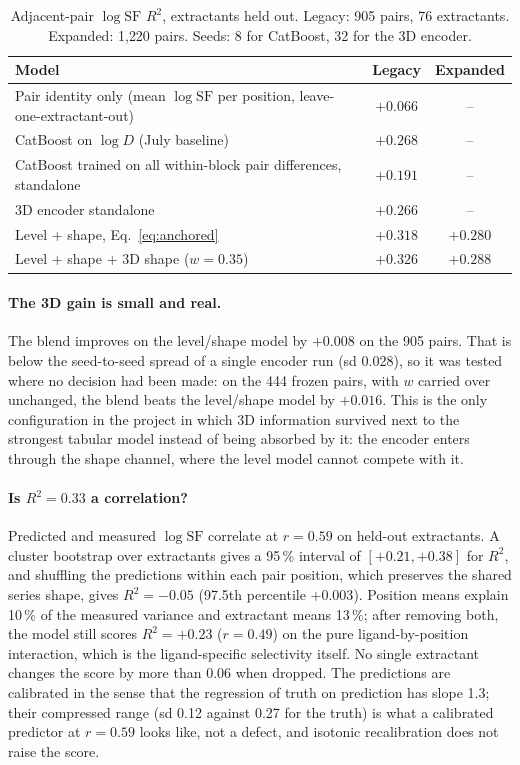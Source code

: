\documentclass{article}
\begin{document}
\begin{table}[t]
	\centering
	\caption{Adjacent-pair $\log \mathrm{SF}$ $R^2$, extractants held out. Legacy: 905 pairs, 76 extractants. Expanded: 1{,}220 pairs. Seeds: 8 for CatBoost, 32 for the 3D encoder.}
	\label{tab:main}
	\begin{tabular}{lcc}
		\toprule
		Model & Legacy & Expanded \\
		\midrule
		Pair identity only (mean $\log \mathrm{SF}$ per position, leave-one-extractant-out) & $+0.066$ & -- \\
		CatBoost on $\log D$ (July baseline) & $+0.268$ & -- \\
		CatBoost trained on all within-block pair differences, standalone & $+0.191$ & -- \\
		3D encoder standalone & $+0.266$ & -- \\
		Level + shape, Eq.~\eqref{eq:anchored} & $+0.318$ & $+0.280$ \\
		Level + shape + 3D shape ($w = 0.35$) & $\mathbf{+0.326}$ & $\mathbf{+0.288}$ \\
		\bottomrule
	\end{tabular}
\end{table}

\paragraph{The 3D gain is small and real.}
The blend improves on the level/shape model by $+0.008$ on the 905 pairs.
That is below the seed-to-seed spread of a single encoder run (sd 0.028), so it was tested where no decision had been made: on the 444 frozen pairs, with $w$ carried over unchanged, the blend beats the level/shape model by $+0.016$.
This is the only configuration in the project in which 3D information survived next to the strongest tabular model instead of being absorbed by it: the encoder enters through the shape channel, where the level model cannot compete with it.

\paragraph{Is $R^2 = 0.33$ a correlation?}
Predicted and measured $\log \mathrm{SF}$ correlate at $r = 0.59$ on held-out extractants.
A cluster bootstrap over extractants gives a 95\,\% interval of $[+0.21, +0.38]$ for $R^2$, and shuffling the predictions within each pair position, which preserves the shared series shape, gives $R^2 = -0.05$ (97.5th percentile $+0.003$).
Position means explain 10\,\% of the measured variance and extractant means 13\,\%; after removing both, the model still scores $R^2 = +0.23$ ($r = 0.49$) on the pure ligand-by-position interaction, which is the ligand-specific selectivity itself.
No single extractant changes the score by more than 0.06 when dropped.
The predictions are calibrated in the sense that the regression of truth on prediction has slope 1.3; their compressed range (sd 0.12 against 0.27 for the truth) is what a calibrated predictor at $r = 0.59$ looks like, not a defect, and isotonic recalibration does not raise the score.
\end{document}
